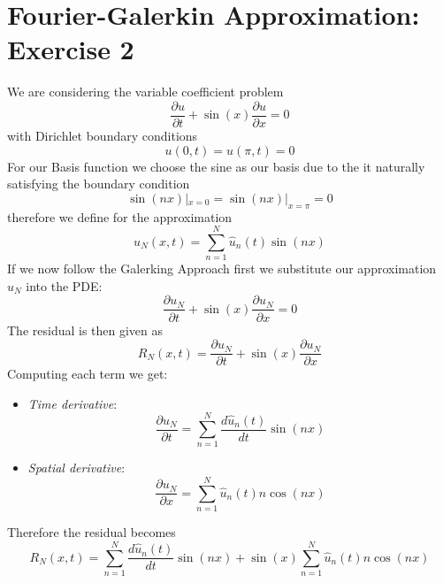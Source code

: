 \section{Fourier-Galerkin Approximation: Exercise 2}
We are considering the variable coefficient problem
\begin{equation}
	\frac{\partial u}{\partial t}+\sin (x) \frac{\partial u}{\partial x}=0
	\label{eq:pde2}
\end{equation}
with Dirichlet boundary conditions
\begin{equation}
	u(0,t) = u(\pi, t) = 0
	\label{eq:bdc2}
\end{equation}
For our Basis function we choose the sine as our basis due to the it naturally satisfying the boundary condition
\begin{equation}
	\sin(nx) |_{x=0} = \sin(nx) |_{x=\pi} = 0
	\label{eq:sin_bdc}
\end{equation}
therefore we define for the approximation
\begin{equation}
	u_N(x, t) = \sum_{n=1}^{N} \hat{u}_n(t) \sin(nx)
	\label{eq:uN2}
\end{equation}
If we now follow the Galerking Approach first we substitute our approximation $u_N$ into the PDE:
\begin{equation}
	\frac{\partial u_N}{\partial t}+\sin (x) \frac{\partial u_N}{\partial x}=0
	\label{eq:un_pde2}
\end{equation}
The residual is then given as
\begin{equation}
	R_N(x, t) = \frac{\partial u_N}{\partial t}+\sin (x) \frac{\partial u_N}{\partial x}
\end{equation}
Computing each term we get:
\begin{itemize}
	\item \textit{Time derivative}: 
		\begin{equation}
			\frac{\partial u_N}{\partial t} = \sum_{n=1}^{N} \frac{d\hat{u}_n(t)}{dt} \sin(nx)
			\label{eq:tim_derv2}
		\end{equation}
	\item \textit{Spatial derivative}:
\begin{equation}
	\frac{\partial u_N}{\partial x} = \sum_{n=1}^{N} \hat{u}_n(t) n \cos(nx)
			\label{eq:spat_derv2}
		\end{equation}
\end{itemize}
Therefore the residual becomes
\begin{equation}
	R_N(x, t) =  \sum_{n=1}^{N} \frac{d\hat{u}_n(t)}{dt} \sin(nx) + \sin(x)  \sum_{n=1}^{N} \hat{u}_n(t) n \cos(nx)
\end{equation}
